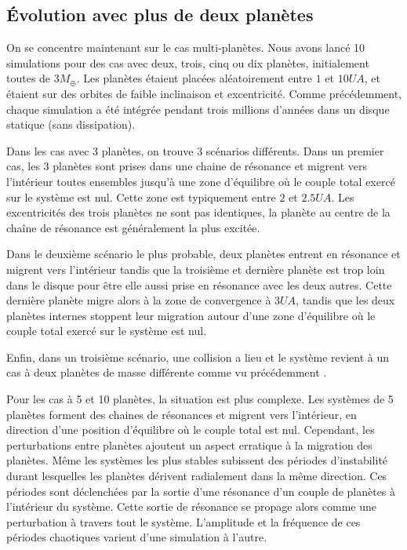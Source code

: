 \subsection{Évolution avec plus de deux planètes}
On se concentre maintenant sur le cas multi-planètes. Nous avons lancé 10 simulations pour des cas avec deux, trois, cinq ou dix planètes, initialement toutes de $3\unit{M_\oplus}$. Les planètes étaient placées aléatoirement entre $1$ et $10\unit{UA}$, et étaient sur des orbites de faible inclinaison et excentricité. Comme précédemment, chaque simulation a été intégrée pendant trois millions d'années dans un disque statique (sans dissipation). 

\bigskip

Dans les cas avec 3 planètes, on trouve 3 scénarios différents. Dans un premier cas, les 3 planètes sont prises dans une chaine de résonance et migrent vers l'intérieur toutes ensembles jusqu'à une zone d'équilibre où le couple total exercé sur le système est nul. Cette zone est typiquement entre $2$ et $2.5\unit{UA}$. Les excentricités des trois planètes ne sont pas identiques, la planète au centre de la chaîne de résonance est généralement la plus excitée. 

Dans le deuxième scénario le plus probable, deux planètes entrent en résonance et migrent vers l'intérieur tandis que la troisième et dernière planète est trop loin dans le disque pour être elle aussi prise en résonance avec les deux autres. Cette dernière planète migre alors à la zone de convergence à $3\unit{UA}$, tandis que les deux planètes internes stoppent leur migration autour d'une zone d'équilibre où le couple total exercé sur le système est nul. 

Enfin, dans un troisième scénario, une collision a lieu et le système revient à un cas à deux planètes de masse différente comme vu précédemment . 

\bigskip

Pour les cas à 5 et 10 planètes, la situation est plus complexe. Les systèmes de 5 planètes forment des chaines de résonances et migrent vers l'intérieur, en direction d'une position d'équilibre où le couple total est nul. Cependant, les perturbations entre planètes ajoutent un aspect erratique à la migration des planètes. Même les systèmes les plus stables subissent des périodes d'instabilité durant lesquelles les planètes dérivent radialement dans la même direction. Ces périodes sont déclenchées par la sortie d'une résonance d'un couple de planètes à l'intérieur du système. Cette sortie de résonance se propage alors comme une perturbation à travers tout le système. L'amplitude et la fréquence de ces périodes chaotiques varient d'une simulation à l'autre. 

